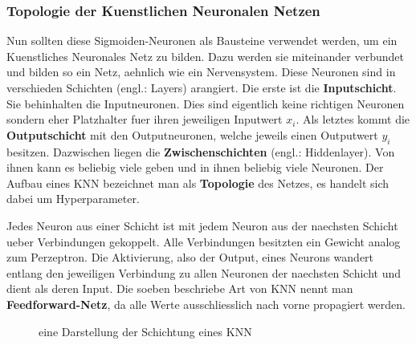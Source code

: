 \documentclass[../main]{subfiles}
\begin{document}
\subsubsection{Topologie der Kuenstlichen Neuronalen Netzen}
Nun sollten diese Sigmoiden-Neuronen als Bausteine verwendet werden, um ein Kuenstliches
Neuronales Netz zu bilden. Dazu werden sie miteinander verbundet und bilden so ein Netz,
aehnlich wie ein Nervensystem.
Diese Neuronen sind in verschieden Schichten (engl.: Layers)
arangiert. Die erste ist die \textbf{Inputschicht}. Sie behinhalten die
Inputneuronen. Dies sind eigentlich keine richtigen
Neuronen sondern eher Platzhalter fuer ihren jeweiligen Inputwert $x_i$. Als letztes kommt die
\textbf{Outputschicht} mit den Outputneuronen, welche jeweils einen Outputwert $y_i$
besitzen. Dazwischen liegen die \textbf{Zwischenschichten} (engl.: Hiddenlayer). Von ihnen kann es
beliebig viele geben und in ihnen beliebig viele Neuronen.
Der Aufbau eines KNN bezeichnet man als \textbf{Topologie} des Netzes, es
handelt sich dabei um Hyperparameter.
\par\medskip
Jedes Neuron aus einer Schicht ist mit jedem Neuron aus der naechsten Schicht ueber
Verbindungen gekoppelt. Alle Verbindungen besitzten ein Gewicht analog zum
Perzeptron. Die Aktivierung, also der Output, eines Neurons wandert entlang den jeweiligen
Verbindung zu allen Neuronen der naechsten Schicht und dient als deren Input.
Die soeben beschriebe Art von KNN nennt man \textbf{Feedforward-Netz}, da alle Werte
ausschliesslich nach vorne propagiert werden.

\begin{figure}[h!]
  \centering
  \label{fi:nn_layers}
  \caption{eine Darstellung der Schichtung eines KNN}
\end{figure}
\end{document}
